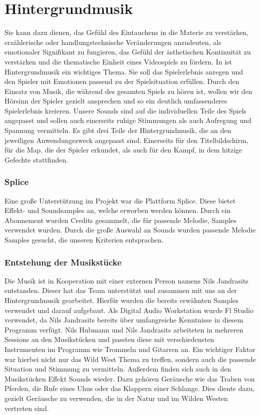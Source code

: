 
\section{Hintergrundmusik}\label{sec:hintergrundmusik}

\renewcommand{\kapitelautor}{Autor: Nils Hubmann}

%
Sie kann dazu dienen, das Gefühl des Eintauchens in die Materie zu verstärken, erzählerische oder handlungstechnische Veränderungen anzudeuten, als emotionaler Signifikant zu fungieren, das Gefühl der ästhetischen Kontinuität zu verstärken und die thematische Einheit eines Videospiels zu fördern.
In \ff ist Hintergrundmusik ein wichtiges Thema.
Sie soll das Spielerlebnis anregen und den Spieler mit Emotionen passend zu der Spielsituation erfüllen.
Durch den Einsatz von Musik, die während des gesamten Spiels zu hören ist, wollen wir den Hörsinn der Spieler gezielt ansprechen und so ein deutlich umfassenderes Spielerlebnis kreieren.
Unsere Sounds sind auf die individuellen Teile des Spiels angepasst und sollen auch einerseits ruhige Stimmungen als auch Aufregung und Spannung vermitteln.
Es gibt drei Teile der Hintergrundmusik, die an den jeweiligen Anwendungszweck angepasst sind.
Einerseits für den Titelbildschirm, für die Map, die der Spieler erkundet, als auch für den Kampf, in dem hitzige Gefechte stattfinden.

\subsubsection{Splice}\label{subsubsec:Splice}
Eine große Unterstützung im Projekt war die Plattform Splice.
Diese bietet Effekt- und Soundsamples an, welche erworben werden können.
Durch ein Abonnement wurden Credits gesammelt, die für passende Melodie, Samples verwendet wurden.
Durch die große Auswahl an Sounds wurden passende Melodie Samples gesucht, die unseren Kriterien entsprachen.

\subsubsection{Entstehung der Musikstücke}\label{subsubsec:Musik-Enstehung}
Die Musik ist in Kooperation mit einer externen Person namens Nils Jandrasits entstanden.
Dieser hat das Team unterstützt und zusammen mit uns an der Hintergrundmusik gearbeitet.
Hierfür wurden die bereits erwähnten Samples verwendet und darauf aufgebaut.
Als Digital Audio Workstation wurde Fl Studio verwendet, da Nils Jandrasits bereits über umfangreiche Kenntnisse in diesem Programm verfügt.
Nils Hubmann und Nils Jandrasits arbeiteten in mehreren Sessions an den Musikstücken und passten diese mit verschiedensten Instrumenten im Programm wie Trommeln und Gitarren an.
Ein wichtiger Faktor war hierbei nicht nur das Wild West Thema zu treffen, sondern auch die passende Situation und Stimmung zu vermitteln.
Außerdem finden sich auch in den Musikstücken Effekt Sounds wieder.
Dazu gehören Geräusche wie das Traben von Pferden, die Rufe eines Uhus oder das Klappern einer Schlange.
Dies diente dazu, gezielt Geräusche zu verwenden, die in der Natur und im Wilden Westen vertreten sind.

